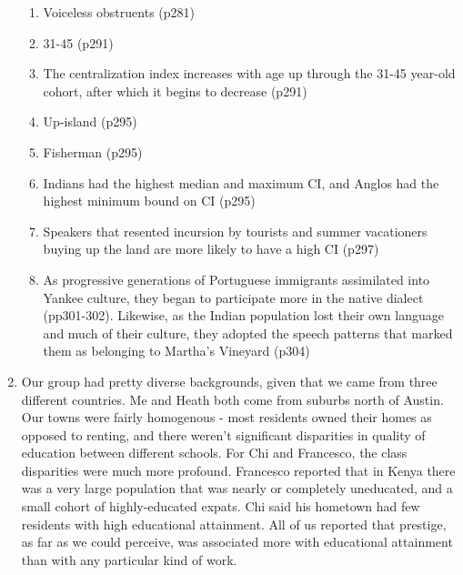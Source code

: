 \documentclass[12pt]{article}
\begin{document}
\begin{enumerate}
          \begin{enumerate}
              \item Voiceless obstruents (p281)
              \item 31-45 (p291)
              \item The centralization index increases with age up through the 31-45 year-old cohort, after which it begins to decrease (p291)
              \item Up-island (p295)
              \item Fisherman (p295)
              \item Indians had the highest median and maximum CI, and Anglos had the highest minimum bound on CI (p295)
              \item Speakers that resented incursion by tourists and summer vacationers buying up the land are more likely to have a high CI (p297)
              \item As progressive generations of Portuguese immigrants assimilated into Yankee culture, they began to participate more in the
              native dialect (pp301-302). Likewise, as the Indian population lost their own language and much of their culture, they adopted the
              speech patterns that marked them as belonging to Martha's Vineyard (p304)

          \end{enumerate}

          \item Our group had pretty diverse backgrounds, given that we came from three different countries. Me and Heath both come from suburbs north of
          Austin. Our towns were fairly homogenous - most residents owned their homes as opposed to renting, and there weren't significant disparities in
          quality of education between different schools. For Chi and Francesco, the class disparities were much more profound. Francesco reported that in
          Kenya there was a very large population that was nearly or completely uneducated, and a small cohort of highly-educated expats. Chi said his hometown
          had few residents with high educational attainment.
          All of us reported that prestige, as far as we could perceive, was associated more with educational attainment than with any particular kind of work.
          
\end{enumerate}
\end{document}
